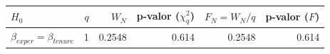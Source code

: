 
\begin{tabular}{lrrrrr}
\toprule
$H_0$ & $q$ & $W_N$ & p-valor ($\chi^2_q$) & $F_N=W_N/q$ & p-valor ($F$)\\
\midrule
$\beta_{exper}=\beta_{tenure}$ & 1 & 0.2548 & 0.614 & 0.2548 & 0.614\\
\bottomrule
\end{tabular}
